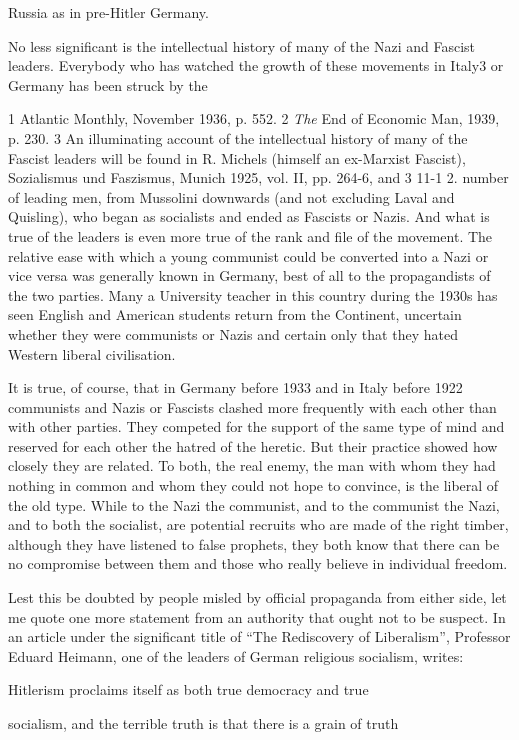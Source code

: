 \documentclass[11pt,openany]{book}
\begin{document}
Russia as in pre-Hitler Germany.

No less significant is the intellectual history of many of the Nazi and Fascist leaders. Everybody who has watched the growth of these movements in Italy3 or Germany has been struck by the

1 Atlantic Monthly, November 1936, p. 552. 2 \emph{The} End of Economic Man, 1939, p. 230. 3 An illuminating account of the intellectual history of many of the Fascist leaders will be found in R. Michels (himself an ex-Marxist Fascist), Sozialismus und Faszismus, Munich 1925, vol. II, pp. 264-6, and 3 11-1 2. number of leading men, from Mussolini downwards (and not excluding Laval and Quisling), who began as socialists and ended as Fascists or Nazis. And what is true of the leaders is even more true of the rank and file of the movement. The relative ease with which a young communist could be converted into a Nazi or vice versa was generally known in Germany, best of all to the propagandists of the two parties. Many a University teacher in this country during the 1930s has seen English and American students return from the Continent, uncertain whether they were communists or Nazis and certain only that they hated Western liberal civilisation.

It is true, of course, that in Germany before 1933 and in Italy before 1922 communists and Nazis or Fascists clashed more frequently with each other than with other parties. They competed for the support of the same type of mind and reserved for each other the hatred of the heretic. But their practice showed how closely they are related. To both, the real enemy, the man with whom they had nothing in common and whom they could not hope to convince, is the liberal of the old type. While to the Nazi the communist, and to the communist the Nazi, and to both the socialist, are potential recruits who are made of the right timber, although they have listened to false prophets, they both know that there can be no compromise between them and those who really believe in individual freedom.

Lest this be doubted by people misled by official propaganda from either side, let me quote one more statement from an authority that ought not to be suspect. In an article under the significant title of ``The Rediscovery of Liberalism'', Professor Eduard Heimann, one of the leaders of German religious socialism, writes:

Hitlerism proclaims itself as both true democracy and true

socialism, and the terrible truth is that there is a grain of truth
\end{document}

